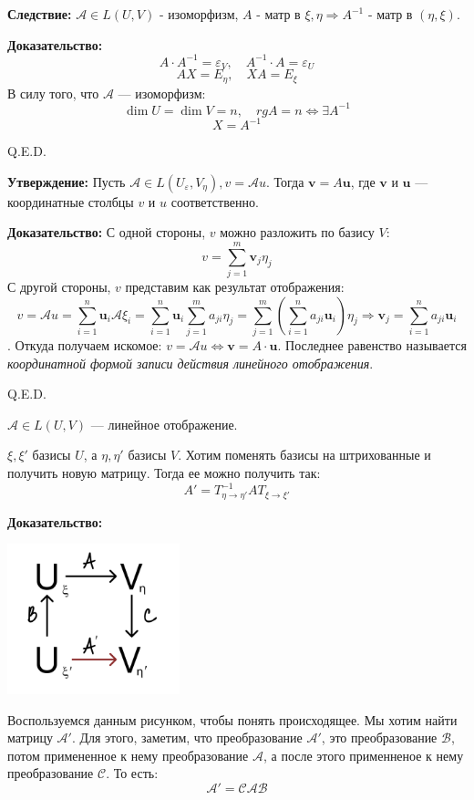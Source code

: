 \textbf{Следствие:} $\mathcal{A} \in L(U,V)$ - изоморфизм, $A$ - матр в $\xi,\eta \Rightarrow A^{-1}$ - матр в $(\eta, \xi)$. 

\textbf{Доказательство:}
$$A \cdot A^{-1} = \varepsilon_V, \quad A^{-1} \cdot A = \varepsilon_U$$
$$AX = E_{\eta}, \quad XA = E_{\xi}$$
В силу того, что $\mathcal{A}$ --- изоморфизм:
$$\dim U = \dim V = n, \quad rgA = n \Leftrightarrow \exists A^{-1}$$
$$X = A^{-1}$$

\hfill Q.E.D.

\textbf{Утверждение:}
Пусть $\mathcal{A} \in L(U_{\varepsilon}, V_{\eta}), v = \mathcal{A}u$.
Тогда $\mathbf{v} = A\mathbf{u}$, где $\mathbf{v}$ и $\mathbf{u}$ --- координатные столбцы $v$ и $u$ соответственно.


\textbf{Доказательство:}
С одной стороны, $v$ можно разложить по базису $V$:
$$v = \sum\limits_{j = 1}^{m} \mathbf{v}_j\eta_j$$
С другой стороны, $v$ представим как результат отображения:
$$v = \mathcal{A}u = \sum\limits_{i=1}^n \mathbf{u}_i \mathcal{A} \xi_i = \sum\limits_{i=1}^n \mathbf{u}_i \sum\limits_{j=1}^ma_{ji} \eta_j = \sum\limits_{j=1}^m (\sum\limits_{i=1}^na_{ji}\mathbf{u}_i)\eta_j  \Rightarrow \mathbf{v}_j =\sum\limits_{i=1}^na_{ji}\mathbf{u}_i$$.
Откуда получаем искомое: $v = \mathcal{A} u \Leftrightarrow \mathbf{v} = A \cdot \mathbf{u}$. Последнее равенство называется \emph{координатной формой записи действия линейного отображения}.

\hfill Q.E.D.


$\mathcal{A} \in L(U,V)$ --- линейное отображение.

$\xi,\xi'$ базисы $U$, а $\eta, \eta'$ базисы $V$. Хотим поменять базисы на штрихованные и получить новую матрицу. Тогда ее можно получить так:
$$A' = T^{-1}_{\eta \rightarrow \eta'} A T_{\xi\rightarrow \xi'}$$

\textbf{Доказательство:}

\begin{center}
    \includegraphics[width = 5cm]{assets/7_2_1.png}
\end{center}
    Воспользуемся данным рисунком, чтобы понять происходящее. Мы хотим найти матрицу $\mathcal{A}'$. Для этого, заметим, что преобразование $\mathcal{A}'$, это преобразование $\mathcal{B}$, потом примененное к нему преобразование $\mathcal{A}$, а после этого применненое к нему преобразование $\mathcal{C}$. То есть:
    $$\mathcal{A}'=\mathcal{C}\mathcal{A}\mathcal{B}$$

